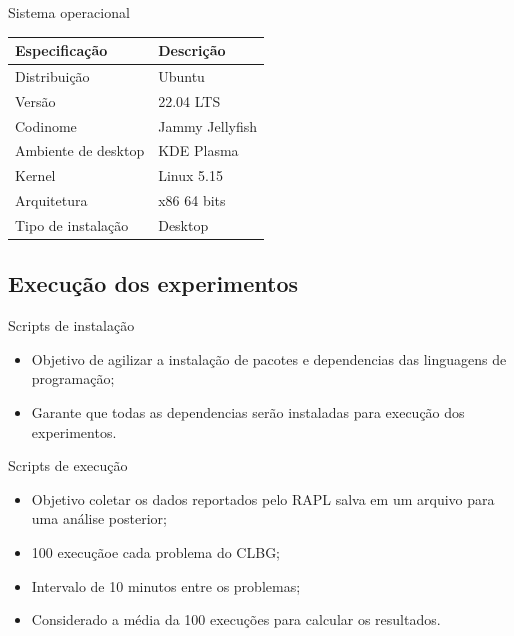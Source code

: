\begin{frame}{Sistema operacional}
    \centering
    \begin{table}[h]
        \centering
        \begin{tabular}{l|l}
            \textbf{Especificação} & \textbf{Descrição} \\
            \toprule
            Distribuição & Ubuntu \\
            \hline
            Versão & 22.04 LTS  \\
            \hline
            Codinome & Jammy Jellyfish \\
            \hline
            Ambiente de desktop & KDE Plasma \\
            \hline
            Kernel & Linux 5.15 \\
            \hline
            Arquitetura & x86 64 bits \\
            \hline
            Tipo de instalação & Desktop\\
        \end{tabular}
    \end{table}
\end{frame}

\subsection{Execução dos experimentos}

\begin{frame}{Scripts de instalação}
    \begin{itemize}
        \item Objetivo de agilizar a instalação de pacotes e dependencias das linguagens de programação;
        \item Garante que todas as dependencias serão instaladas para execução dos experimentos.
    \end{itemize}
\end{frame}

\begin{frame}{Scripts de execução}
    \begin{itemize}
        \item Objetivo coletar os dados reportados pelo RAPL salva em um arquivo para uma análise posterior;
        \item 100 execuçãoe cada problema do CLBG;
        \item Intervalo de 10 minutos entre os problemas;
        \item Considerado a média da 100 execuções para calcular os resultados.
    \end{itemize}
\end{frame}

